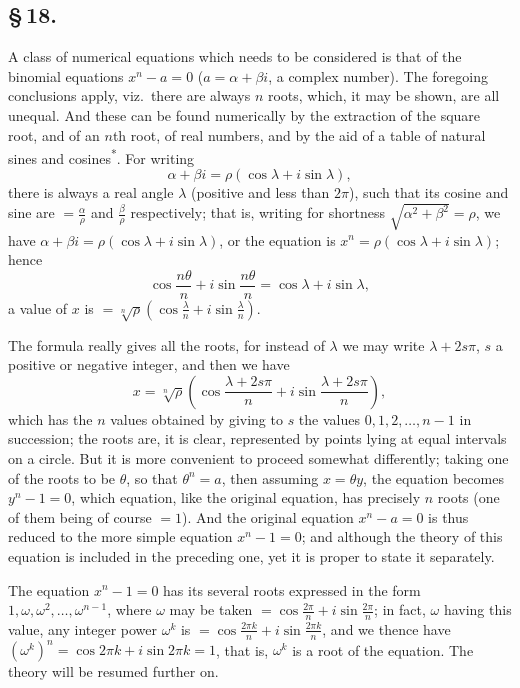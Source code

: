\documentclass[11pt,a4paper]{book}
\begin{document}
\subsection*{\S\,18.}

A class of numerical equations which needs to be considered is that of the binomial equations $x^{n} - a = 0$ ($a = \alpha + \beta i$, a complex number). The foregoing conclusions apply, viz.\ there are always $n$ roots, which, it may be shown, are all unequal. And these can be found numerically by the extraction of the square root, and of an $n$th root, of real numbers, and by the aid of a table of natural sines and cosines\textsuperscript{*}. For writing
\[
\alpha + \beta i = \rho(\cos\lambda + i\sin\lambda),
\]
there is always a real angle $\lambda$ (positive and less than $2\pi$), such that its cosine and sine are $= \frac{\alpha}{\rho}$ and $\frac{\beta}{\rho}$ respectively; that is, writing for shortness $\sqrt{\alpha^{2} + \beta^{2}} = \rho$, we have $\alpha + \beta i = \rho(\cos\lambda + i\sin\lambda)$, or the equation is $x^{n} = \rho(\cos\lambda + i\sin\lambda)$; hence
\[
\cos\frac{n\theta}{n} + i\sin\frac{n\theta}{n} = \cos\lambda + i\sin\lambda,
\]
a value of $x$ is $= \sqrt[n]{\rho}\left(\cos\frac{\lambda}{n} + i\sin\frac{\lambda}{n}\right)$.

The formula really gives all the roots, for instead of $\lambda$ we may write $\lambda + 2s\pi$, $s$ a positive or negative integer, and then we have
\[
x = \sqrt[n]{\rho}\left(\cos\frac{\lambda + 2s\pi}{n} + i\sin\frac{\lambda + 2s\pi}{n}\right),
\]
which has the $n$ values obtained by giving to $s$ the values $0, 1, 2, \ldots, n-1$ in succession; the roots are, it is clear, represented by points lying at equal intervals on a circle. But it is more convenient to proceed somewhat differently; taking one of the roots to be $\theta$, so that $\theta^{n} = a$, then assuming $x = \theta y$, the equation becomes $y^{n} - 1 = 0$, which equation, like the original equation, has precisely $n$ roots (one of them being of course $= 1$). And the original equation $x^{n} - a = 0$ is thus reduced to the more simple equation $x^{n} - 1 = 0$; and although the theory of this equation is included in the preceding one, yet it is proper to state it separately.

The equation $x^{n} - 1 = 0$ has its several roots expressed in the form $1, \omega, \omega^{2}, \ldots, \omega^{n-1}$, where $\omega$ may be taken $= \cos\frac{2\pi}{n} + i\sin\frac{2\pi}{n}$; in fact, $\omega$ having this value, any integer power $\omega^{k}$ is $= \cos\frac{2\pi k}{n} + i\sin\frac{2\pi k}{n}$, and we thence have $(\omega^{k})^{n} = \cos 2\pi k + i\sin 2\pi k = 1$, that is, $\omega^{k}$ is a root of the equation. The theory will be resumed further on.
\end{document}
